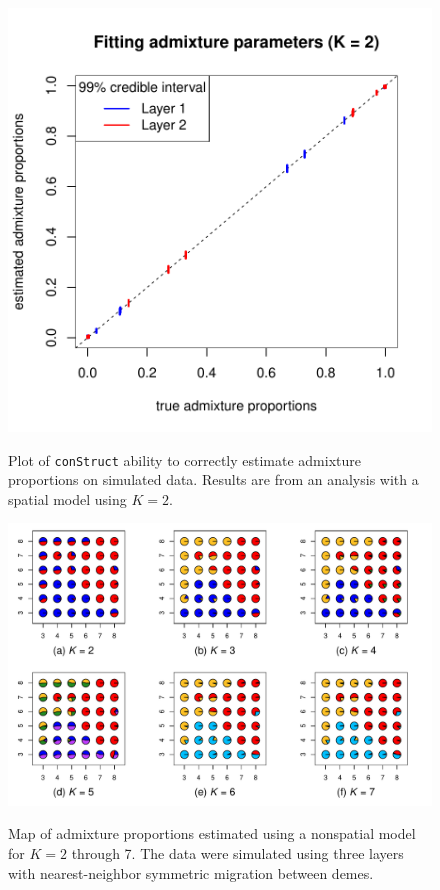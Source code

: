 \documentclass[10pt,letterpaper]{article}
\begin{document}
\begin{figure}
	\centering
		{\includegraphics[width=\textwidth]{figs/sims/simK2_adprop_fit.pdf}}
		\caption{
			Plot of \texttt{conStruct} ability to correctly estimate admixture proportions on simulated data.
			Results are from an analysis with a spatial model using $K=2$.
		}\label{simK2_adprop_fit}
\end{figure}

\begin{figure}
	\centering
		{\includegraphics[width=\textwidth]{figs/sims/simK3_nsp_pies.pdf}}
	\caption{
	Map of admixture proportions estimated using a nonspatial model for $K=2$ through 7.
	The data were simulated using three layers with nearest-neighbor symmetric migration between demes.
    }\label{simK3_nsp_pies}
\end{figure}
\end{document}
